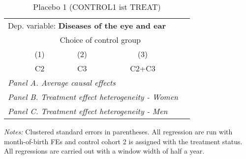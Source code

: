  \begin{table}[H] \centering \begin{threeparttable} \caption{Placebo 1 (CONTROL1 ist TREAT) } {\def\sym#1{\ifmmode^{#1}\else\(^{#1}\)\fi} \begin{tabular}{l*{4}{c}} \toprule \multicolumn{4}{l}{Dep. variable: \textbf{Diseases of the eye and ear}} \\ & \multicolumn{3}{c}{Choice of control group} \\ \cmidrule(lr){2-4}
            &\multicolumn{1}{c}{(1)}&\multicolumn{1}{c}{(2)}&\multicolumn{1}{c}{(3)}\\
            &\multicolumn{1}{c}{C2}&\multicolumn{1}{c}{C3}&\multicolumn{1}{c}{C2+C3}\\
\midrule
 \multicolumn{4}{l}{\emph{Panel A. Average causal effects}} \\      \midrule\multicolumn{4}{l}{\emph{Panel B. Treatment effect heterogeneity - Women}} \\      \midrule\multicolumn{4}{l}{\emph{Panel C. Treatment effect heterogeneity - Men}} \\      
\bottomrule \end{tabular} } \begin{tablenotes} \item \scriptsize \emph{Notes:} Clustered standard errors in parentheses. All regression are run with month-of-birth FEs and control cohort 2 is assigned with the treatment status. All regressions are carried out with a window width of half a year. \end{tablenotes} \end{threeparttable} \end{table} 
